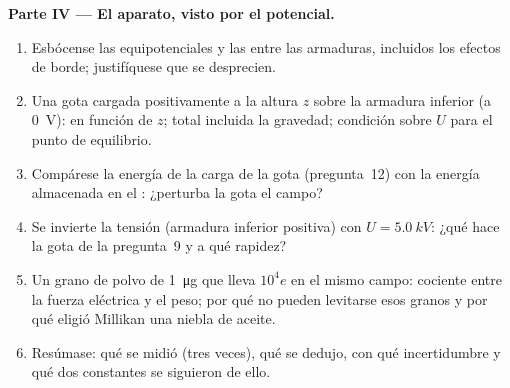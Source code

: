 \begin{problem}
\medskip
\noindent\textbf{Parte IV --- El aparato, visto por el potencial.}
\begin{enumerate}[resume]
  \item Esbócense las equipotenciales y las  entre las
        armaduras, incluidos los efectos de borde; justifíquese que se
        desprecien.
  \item Una gota cargada positivamente a la altura $z$ sobre la armadura
        inferior (a \qty{0}{V}):  en función de $z$;
         total incluida la gravedad; condición sobre $U$
        para el punto de equilibrio.
  \item Compárese la energía de la carga de la gota (pregunta~12) con la
        energía almacenada en el : ¿perturba la gota el campo?
  \item Se invierte la tensión (armadura inferior positiva) con
        $U = \qty{5.0}{kV}$: ¿qué hace la gota de la pregunta~9 y a qué
        rapidez?
  \item Un grano de polvo de \qty{1}{\micro g} que lleva $10^4e$ en el
        mismo campo: cociente entre la fuerza eléctrica y el peso; por qué
        no pueden levitarse esos granos y por qué eligió Millikan una
        niebla de aceite.
  \item Resúmase: qué se midió (tres veces), qué se dedujo, con qué
        incertidumbre y qué dos constantes se siguieron de ello.
\end{enumerate}
\end{problem}
